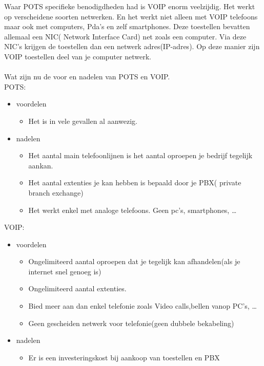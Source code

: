 \documentclass[pdftex,a4paper,12pt,twoside]{report}
\begin{document}
Waar POTS specifieke benodigdheden had is VOIP enorm veelzijdig. Het werkt op verscheidene soorten netwerken. En het werkt niet alleen met VOIP telefoons maar ook met computers, Pda’s en zelf smartphones. Deze toestellen bevatten allemaal een NIC( Network Interface Card) net zoals een computer. Via deze NIC’s krijgen de toestellen dan een netwerk adres(IP-adres). Op deze manier zijn VOIP toestellen deel van je computer netwerk. \\ \\
Wat zijn nu de voor en nadelen van POTS en VOIP.\\

POTS: \\
\begin{itemize}
	\item voordelen
	\begin{itemize}
		\item Het is in vele gevallen al aanwezig.
	\end{itemize}
	\item nadelen
	\begin{itemize}
		\item Het aantal main telefoonlijnen is het aantal oproepen je bedrijf tegelijk aankan. 
		\item Het aantal extenties je kan hebben is bepaald door je PBX( private branch exchange)
		\item Het werkt enkel met analoge telefoons. Geen pc's, smartphones, \ldots
	\end{itemize}
\end{itemize} 
VOIP: \\
\begin{itemize}
	\item voordelen
	\begin{itemize}
		\item Ongelimiteerd aantal oproepen dat je tegelijk kan afhandelen(als je internet snel genoeg is)
		\item Ongelimiteerd aantal extenties.
		\item Bied meer aan dan enkel telefonie zoals Video calls,bellen vanop PC's, \ldots
		\item Geen gescheiden netwerk voor telefonie(geen dubbele bekabeling)
	\end{itemize}
	\item nadelen
	\begin{itemize}
		\item Er is een investeringskost bij aankoop van toestellen en PBX
	\end{itemize}
\end{itemize} 
\end{document}
